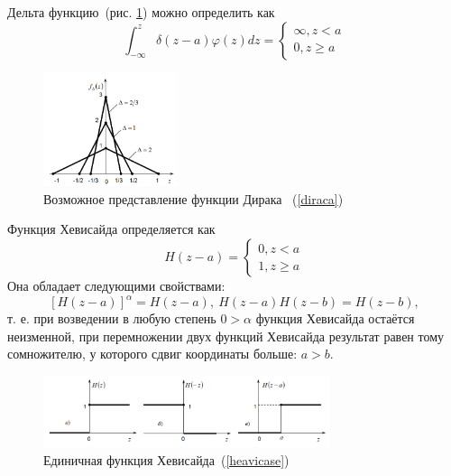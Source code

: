 \documentclass[12pt, a4paper]{article}
\begin{document}
Дельта функцию~(рис. \ref{dirac}) можно определить как 
\begin{equation}
	\label{diraca}
	\int_{-\infty}^z \delta (z - a) \varphi (z) dz = 
		\begin{cases}
			\infty, z < a \\
			0, z \geqslant a	
		\end{cases}
\end{equation}
\begin{figure}[!h]
	\centering
	\includegraphics[width=0.35\textwidth]{dirac}%
	\caption{Возможное представление функции Дирака ~(\ref{diraca})}
	\vspace*{-2mm}
	\label{dirac}
\end{figure}

Функция Хевисайда определяется как
\begin{equation}
	\label{heavicase}
	H(z - a) = 
	\begin{cases}
		0, z < a \\
		1, z \geqslant a	
	\end{cases}
\end{equation}
Она обладает следующими свойствами:
\begin{equation}
	\label{heavicase}
	[H(z - a)]^\alpha = H(z - a),~
	H(z - a) H(z - b) = H(z - b),	
\end{equation}
т. е. при возведении в любую степень $0 > \alpha$ функция Хевисайда остаётся
неизменной, при перемножении двух функций Хевисайда результат равен
тому сомножителю, у которого сдвиг координаты больше: $a > b$.

\begin{figure}[!h]
	\centering
	\includegraphics[width=0.75\textwidth]{heavi}%
	\caption{Единичная функция Хевисайда~(\ref{heavicase})}
	\vspace*{-2mm}
	\label{heavi}
\end{figure}
\end{document}
